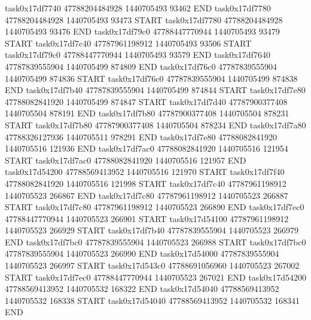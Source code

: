 task0x17df7740 47788204484928          1440705493                93462  END
task0x17df7780 47788204484928          1440705493                93473  START
task0x17df7780 47788204484928          1440705493                93476  END
task0x17df79c0 47788447770944          1440705493                93479  START
task0x17df7c40 47787961198912          1440705493                93506  START
task0x17df79c0 47788447770944          1440705493                93579  END
task0x17df7640 47787839555904          1440705499               874809  END
task0x17df76c0 47787839555904          1440705499               874836  START
task0x17df76c0 47787839555904          1440705499               874838  END
task0x17df7b40 47787839555904          1440705499               874844  START
task0x17df7e80 47788082841920          1440705499               874847  START
task0x17df7d40 47787900377408          1440705504               878191  END
task0x17df7b80 47787900377408          1440705504               878231  START
task0x17df7b80 47787900377408          1440705504               878234  END
task0x17df7a80 47788326127936          1440705511               978291  END
task0x17df7e80 47788082841920          1440705516               121936  END
task0x17df7ac0 47788082841920          1440705516               121954  START
task0x17df7ac0 47788082841920          1440705516               121957  END
task0x17d54200 47788569413952          1440705516               121970  START
task0x17df7f40 47788082841920          1440705516               121998  START
task0x17df7c40 47787961198912          1440705523               266867  END
task0x17df7c80 47787961198912          1440705523               266887  START
task0x17df7c80 47787961198912          1440705523               266890  END
task0x17df7ec0 47788447770944          1440705523               266901  START
task0x17d54100 47787961198912          1440705523               266929  START
task0x17df7b40 47787839555904          1440705523               266979  END
task0x17df7bc0 47787839555904          1440705523               266988  START
task0x17df7bc0 47787839555904          1440705523               266990  END
task0x17d54000 47787839555904          1440705523               266997  START
task0x17d543c0 47788691056960          1440705523               267002  START
task0x17df7ec0 47788447770944          1440705523               267021  END
task0x17d54200 47788569413952          1440705532               168322  END
task0x17d54040 47788569413952          1440705532               168338  START
task0x17d54040 47788569413952          1440705532               168341  END
